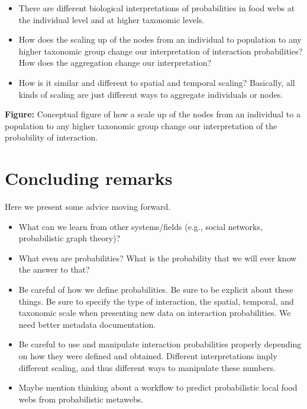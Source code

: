 \documentclass[11pt]{article}
\begin{document}
\begin{itemize}
\tightlist
\item
  There are different biological interpretations of probabilities in
  food webs at the individual level and at higher taxonomic levels.
\item
  How does the scaling up of the nodes from an individual to population
  to any higher taxonomic group change our interpretation of interaction
  probabilities? How does the aggregation change our interpretation?
\item
  How is it similar and different to spatial and temporal scaling?
  Basically, all kinds of scaling are just different ways to aggregate
  individuals or nodes.
\end{itemize}

\textbf{Figure:} Conceptual figure of how a scale up of the nodes from
an individual to a population to any higher taxonomic group change our
interpretation of the probability of interaction.

\hypertarget{concluding-remarks}{%
\section{Concluding remarks}\label{concluding-remarks}}

Here we present some advice moving forward.

\begin{itemize}
\tightlist
\item
  What can we learn from other systems/fields (e.g., social networks,
  probabilistic graph theory)?
\item
  What even are probabilities? What is the probability that we will ever
  know the answer to that?
\item
  Be careful of how we define probabilities. Be sure to be explicit
  about these things. Be sure to specify the type of interaction, the
  spatial, temporal, and taxonomic scale when presenting new data on
  interaction probabilities. We need better metadata documentation.
\item
  Be careful to use and manipulate interaction probabilities properly
  depending on how they were defined and obtained. Different
  interpretations imply different scaling, and thus different ways to
  manipulate these numbers.
\item
  Maybe mention thinking about a workflow to predict probabilistic local
  food webs from probabilistic metawebs.
\end{itemize}
\end{document}
